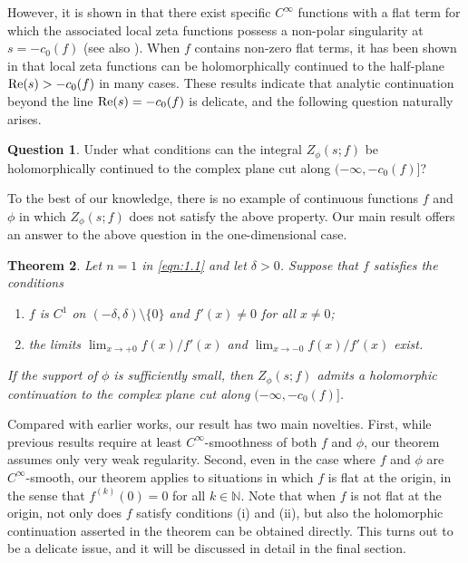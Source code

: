 \documentclass[12pt]{amsart}
\numberwithin{equation}{section}
\newtheorem{theorem}{Theorem}[section]
\theoremstyle{definition}
\newtheorem{question}[theorem]{Question}
\theoremstyle{remark}
\newcommand{\N}{{\mathbb N}}
\newcommand{\1}{{\bf 1}}
\begin{document}
However, 
it is shown in \cite{KaN19, KaM24}  
that there exist specific $C^{\infty}$ 
functions with a flat term 
for which the associated local zeta functions 
possess a non-polar singularity
at $s=-c_0(f)$ (see also \cite{Nos25}).  
When $f$ contains non-zero flat terms, 
it has been shown in 
\cite{Gre06, KaN19, KaN20, Kam24} 
that local zeta functions 
can be holomorphically continued 
to the half-plane ${\rm Re}(s)>-c_0(f)$ in 
many cases.
These results indicate that 
analytic continuation beyond the line 
${\rm Re}(s)=-c_0(f)$ is delicate, 
and the following question naturally arises.

\begin{question}
Under what conditions can the integral $Z_{\phi}(s;f)$
be holomorphically continued to the complex plane cut along 
$(-\infty,-c_0(f)]$?
\end{question}

To the best of our knowledge, 
there is no example of continuous functions 
$f$ and $\phi$ in which 
$Z_{\phi}(s;f)$ does not satisfy the above property.
Our main result offers an answer 
to the above question in the one-dimensional case.

\begin{theorem}\label{thm:1.2}
Let $n=1$ in \eqref{eqn:1.1}
and let $\delta>0$.
Suppose that $f$ satisfies 
the conditions
\begin{enumerate}
\item 
$f$ is $C^1$ on 
$(-\delta,\delta)\setminus\{0\}$ and 
$f'(x)\neq 0$ for all $x\neq 0$; 
\item
the limits
$
\lim_{x\to +0}f(x)/f'(x)
$
and
$
\lim_{x\to -0}f(x)/f'(x)
$
exist.
\end{enumerate}
If the support of $\phi$ is sufficiently small,
then $Z_{\phi}(s;f)$ 
admits a holomorphic continuation
to the complex plane cut along
$(-\infty,-c_0(f)]$.
\end{theorem}

Compared with earlier works, 
our result has two main novelties.
First, 
while previous results require 
at least $C^{\infty}$-smoothness 
of both $f$ and $\phi$, 
our theorem assumes only very weak regularity.
Second, 
even in the case where $f$ and $\phi$ 
are $C^{\infty}$-smooth, 
our theorem applies to situations 
in which $f$ is flat at the origin, 
in the sense that $f^{(k)}(0)=0$ 
for all $k\in\N$.
%
Note that when $f$ is not flat at the origin, 
not only does $f$ satisfy conditions (i) and (ii), 
but also 
the holomorphic continuation asserted 
in the theorem can be obtained directly.
This turns out to be a delicate issue, and 
it will be discussed in detail in the final section.
\end{document}
